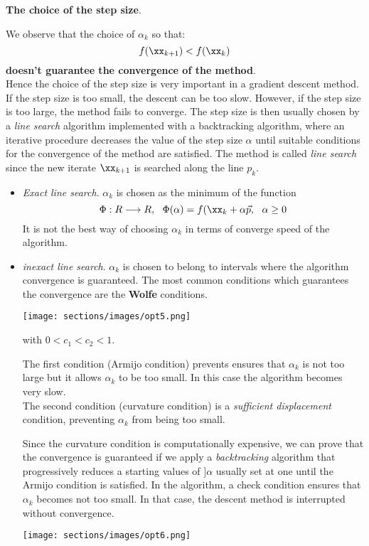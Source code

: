 \textbf{The choice of the step size}.

We observe that the choice of $\alpha_k$ so that:
$$f(\xx_{k+1})<f(\xx_k)$$ 
\textbf{doesn't guarantee the convergence of the method}.\\
Hence the choice of the step size is very important in a gradient descent method. If the step size is too small, the descent can be too slow. However, if the step size is too large, the method fails to converge. The step size is then usually chosen by a \textit{line search} algorithm implemented with a backtracking algorithm, where an iterative procedure decreases the value of the step size $\alpha$ until suitable conditions for the convergence of the method are satisfied. The method is called \textit{line search}  since the new iterate $\xx_{k+1}$ is searched along the line $p_k$.

\begin{itemize}
    \item \textit{Exact line search}.  $\alpha_k$ is chosen as the minimum of the function
    $$\Phi: R \longrightarrow R, \ \ \Phi(\alpha)=f(\xx_k+\alpha \vec{p}, \ \ \alpha \geq 0$$
    It is not the best way of choosing $\alpha_k$ in terms of converge speed of the algorithm.
    \item \textit{inexact line search}. $\alpha_k$ is chosen to belong to intervals  where the algorithm convergence is guaranteed. The most common conditions which guarantees the convergence are the \textbf{Wolfe} conditions. 
    
    \texttt{[image: sections/images/opt5.png]}
    
    with $0<c_1<c_2<1$.
    
    The first condition (Armijo condition) prevents ensures that $\alpha_k$ is not too large but it allows $\alpha_k$ to be too small. In this case the algorithm becomes very slow.\\
    The second condition (curvature condition) is a \textit{sufficient displacement} condition, preventing $\alpha_k$ from being too small.
    
    Since the curvature condition is computationally expensive, we can prove that the convergence is guaranteed if we apply a \textit{backtracking} algorithm that progressively reduces a starting values of $]\alpha$  usually set at one until the Armijo condition is satisfied.  In the algorithm, a check condition ensures that $\alpha_k$ becomes not too small. In that case, the descent method is interrupted without convergence.
    
     \texttt{[image: sections/images/opt6.png]}
\end{itemize}



